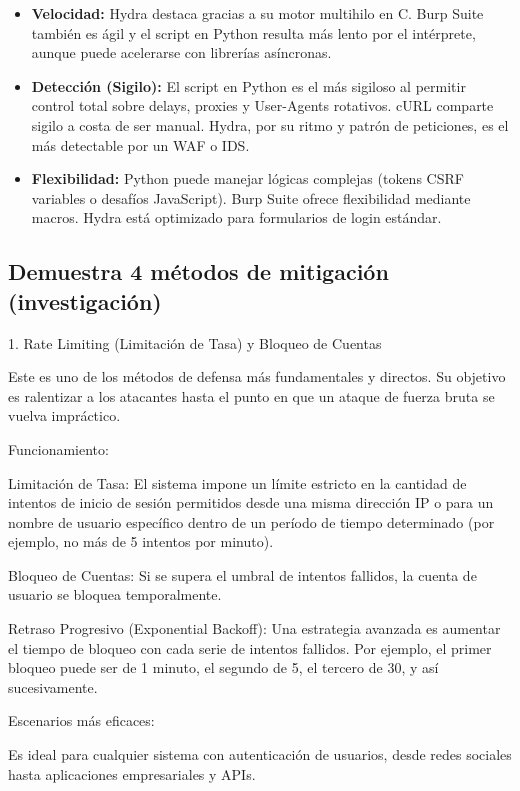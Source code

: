 \documentclass[letterpaper,12pt]{article}
\let\origsubsection\subsection
\renewcommand{\subsection}{\FloatBarrier\origsubsection}
\begin{document}
\begin{itemize}
    \item \textbf{Velocidad:} Hydra destaca gracias a su motor multihilo en C. Burp Suite también es ágil y el script en Python resulta más lento por el intérprete, aunque puede acelerarse con librerías asíncronas.
    \item \textbf{Detección (Sigilo):} El script en Python es el más sigiloso al permitir control total sobre delays, proxies y User-Agents rotativos. cURL comparte sigilo a costa de ser manual. Hydra, por su ritmo y patrón de peticiones, es el más detectable por un WAF o IDS.
    \item \textbf{Flexibilidad:} Python puede manejar lógicas complejas (tokens CSRF variables o desafíos JavaScript). Burp Suite ofrece flexibilidad mediante macros. Hydra está optimizado para formularios de login estándar.
\end{itemize}

\newpage
\subsection{Demuestra 4 métodos de mitigación (investigación)}


1. Rate Limiting (Limitación de Tasa) y Bloqueo de Cuentas

Este es uno de los métodos de defensa más fundamentales y directos. Su objetivo es ralentizar a los atacantes hasta el punto en que un ataque de fuerza bruta se vuelva impráctico.

    Funcionamiento:

        Limitación de Tasa: El sistema impone un límite estricto en la cantidad de intentos de inicio de sesión permitidos desde una misma dirección IP o para un nombre de usuario específico dentro de un período de tiempo determinado (por ejemplo, no más de 5 intentos por minuto).

        Bloqueo de Cuentas: Si se supera el umbral de intentos fallidos, la cuenta de usuario se bloquea temporalmente.

        Retraso Progresivo (Exponential Backoff): Una estrategia avanzada es aumentar el tiempo de bloqueo con cada serie de intentos fallidos. Por ejemplo, el primer bloqueo puede ser de 1 minuto, el segundo de 5, el tercero de 30, y así sucesivamente.

    Escenarios más eficaces:

        Es ideal para cualquier sistema con autenticación de usuarios, desde redes sociales hasta aplicaciones empresariales y APIs.
\end{document}

